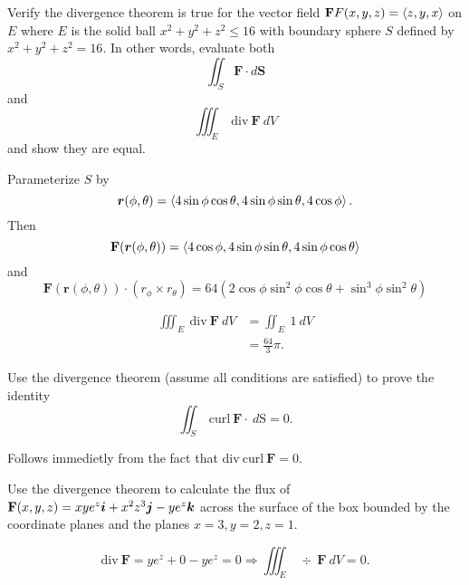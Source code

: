 \documentclass[12pt]{exam}
\newcommand{\mbf}{\mathbf{F}}
\begin{document}
\begin{questions}

\question Verify the divergence theorem is true for the vector field \(\mbf{F}(x,y,z)=\gen{z,y,x}\) on \(E\) where \(E\) is the solid ball \(x^2+y^2+z^2\le 16\) with boundary sphere \(S\) defined by \(x^2+y^2+z^2=16\). In other words, evaluate both 
    \[
        \iint_S\mbf\cdot d\bm{S}
    \]
    and
    \[
        \iiint_E~\mathrm{div}~\mbf~dV
    \]
    and show they are equal.
    \ifprintanswers
        \begin{solution}
            Parameterize \(S\) by 
            \[
                \bm{r}(\phi,\theta)=\left\langle 4\sin\phi\cos\theta,4\sin\phi\sin\theta,4\cos\phi \right\rangle.
            \]
            Then 
                \[
                    \mbf(\bm{r}(\phi,\theta))=\gen{4\cos\phi,4\sin\phi\sin\theta,4\sin\phi\cos\theta}
                \]
                and 
                \[
                \mbf(\bm{r}(\phi,\theta))\cdot(r_\phi\times r_\theta)=64\left(2\cos\phi\sin^2\phi\cos\theta+\sin^3\phi\sin^2\theta\right)
                \]
            
            
            \begin{align*}
                \iiint_E~\mathrm{div}~\mbf~dV & = \iint_E~1~dV\\
                & = \frac{64}{3}\pi.
            \end{align*}
        \end{solution}
    \else
        \vfill
    \fi

\newpage 

\question Use the divergence theorem (assume all conditions are satisfied) to prove the identity
\[
        \iint_S~\mathrm{curl}~\mbf\cdot~d\mathrm{S}=0.
\]

    \ifprintanswers
        \begin{solution}
            Follows immedietly from the fact that \(\mathrm{div}~\mathrm{curl}~\mbf=0.\)
        \end{solution}
    \else
        \vfill
    \fi

\question Use the divergence theorem to calculate the flux of 
    \(\mbf(x,y,z)=xye^z\bi+x^2z^3\bj-ye^z\bk\)
    across the surface of the box bounded by the coordinate planes and the planes \(x=3,y=2,z=1\).

    \ifprintanswers
        \begin{solution}
            \[
                \mathrm{div}~\bm{F}  = ye^z+0-ye^z=0 \Longrightarrow \iiint_E~\div~\mbf~dV = 0.
            \]
        \end{solution}
    \else
        \vfill
    \fi


\end{questions}
\end{document}
